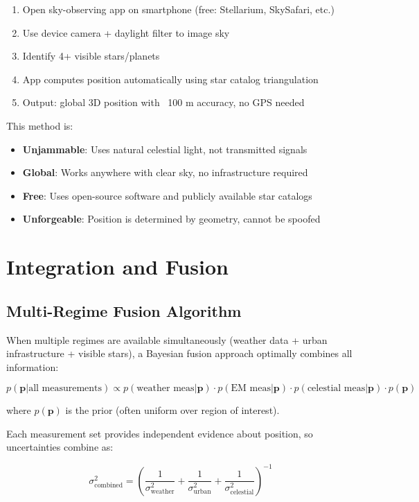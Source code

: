 \documentclass[11pt,twocolumn,a4paper]{article}
\theoremstyle{definition}
\begin{document}
\begin{enumerate}[nosep]
\item Open sky-observing app on smartphone (free: Stellarium, SkySafari, etc.)
\item Use device camera + daylight filter to image sky
\item Identify 4+ visible stars/planets
\item App computes position automatically using star catalog triangulation
\item Output: global 3D position with ~100 m accuracy, no GPS needed
\end{enumerate}

This method is:
\begin{itemize}[nosep]
\item \textbf{Unjammable}: Uses natural celestial light, not transmitted signals
\item \textbf{Global}: Works anywhere with clear sky, no infrastructure required
\item \textbf{Free}: Uses open-source software and publicly available star catalogs
\item \textbf{Unforgeable}: Position is determined by geometry, cannot be spoofed
\end{itemize}

\section{Integration and Fusion}

\subsection{Multi-Regime Fusion Algorithm}

When multiple regimes are available simultaneously (weather data + urban infrastructure + visible stars), a Bayesian fusion approach optimally combines all information:

\[
p(\mathbf{p} | \text{all measurements}) \propto p(\text{weather meas} | \mathbf{p}) \cdot p(\text{EM meas} | \mathbf{p}) \cdot p(\text{celestial meas} | \mathbf{p}) \cdot p(\mathbf{p})
\]

where $p(\mathbf{p})$ is the prior (often uniform over region of interest).

Each measurement set provides independent evidence about position, so uncertainties combine as:

\[
\sigma_{\text{combined}}^2 = \left( \frac{1}{\sigma_{\text{weather}}^2} + \frac{1}{\sigma_{\text{urban}}^2} + \frac{1}{\sigma_{\text{celestial}}^2} \right)^{-1}
\]
\end{document}

